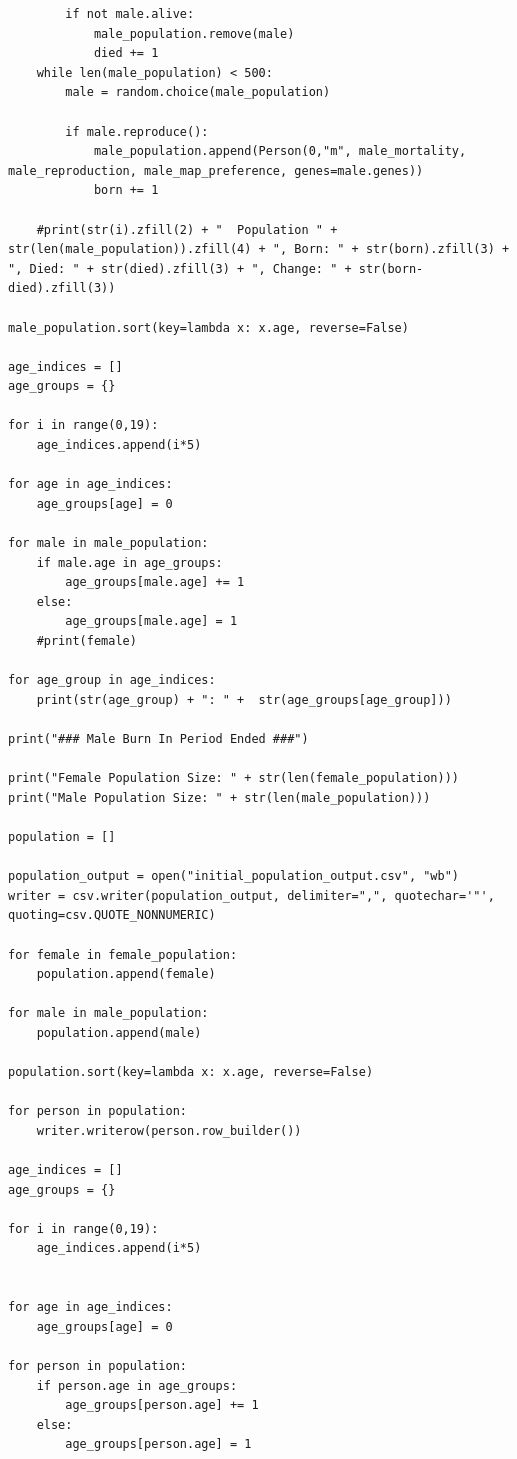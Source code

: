 \documentclass[authoryearcitations]{UoYCSproject}
\begin{document}
\begin{landscape}
\begin{verbatim}
        if not male.alive:
            male_population.remove(male)
            died += 1
    while len(male_population) < 500:
        male = random.choice(male_population)

        if male.reproduce():
            male_population.append(Person(0,"m", male_mortality, male_reproduction, male_map_preference, genes=male.genes))
            born += 1

    #print(str(i).zfill(2) + "  Population " + str(len(male_population)).zfill(4) + ", Born: " + str(born).zfill(3) + ", Died: " + str(died).zfill(3) + ", Change: " + str(born-died).zfill(3))

male_population.sort(key=lambda x: x.age, reverse=False)

age_indices = []
age_groups = {}

for i in range(0,19):
    age_indices.append(i*5)

for age in age_indices:
    age_groups[age] = 0

for male in male_population:
    if male.age in age_groups:
        age_groups[male.age] += 1
    else:
        age_groups[male.age] = 1
    #print(female)

for age_group in age_indices:
    print(str(age_group) + ": " +  str(age_groups[age_group]))

print("### Male Burn In Period Ended ###")

print("Female Population Size: " + str(len(female_population)))
print("Male Population Size: " + str(len(male_population)))

population = []

population_output = open("initial_population_output.csv", "wb")
writer = csv.writer(population_output, delimiter=",", quotechar='"', quoting=csv.QUOTE_NONNUMERIC)

for female in female_population:
    population.append(female)

for male in male_population:
    population.append(male)

population.sort(key=lambda x: x.age, reverse=False)

for person in population:
    writer.writerow(person.row_builder())

age_indices = []
age_groups = {}

for i in range(0,19):
    age_indices.append(i*5)


for age in age_indices:
    age_groups[age] = 0

for person in population:
    if person.age in age_groups:
        age_groups[person.age] += 1
    else:
        age_groups[person.age] = 1


\end{verbatim}
\end{landscape}
\end{document}
